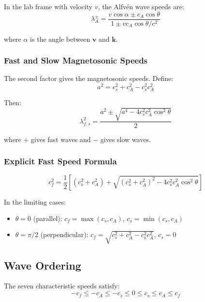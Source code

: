 \documentclass[12pt,a4paper]{article}
\begin{document}
In the lab frame with velocity $v$, the Alfv\'en wave speeds are:
\begin{equation}
\lambda_A^\pm = \frac{v \cos\alpha \pm c_A \cos\theta}{1 \pm v c_A \cos\theta/c^2}
\label{eq:alfven_lab_frame}
\end{equation}

where $\alpha$ is the angle between $\bm{v}$ and $\bm{k}$.

\subsubsection{Fast and Slow Magnetosonic Speeds}

The second factor gives the magnetosonic speeds. Define:
\begin{equation}
a^2 = c_s^2 + c_A^2 - c_s^2 c_A^2
\label{eq:a_squared}
\end{equation}

Then:
\begin{equation}
\lambda_{f,s}^2 = \frac{a^2 \pm \sqrt{a^4 - 4 c_s^2 c_A^2 \cos^2\theta}}{2}
\label{eq:fast_slow_speeds}
\end{equation}

where $+$ gives fast waves and $-$ gives slow waves.

\subsubsection{Explicit Fast Speed Formula}

\begin{equation}
\boxed{
c_f^2 = \frac{1}{2}\left[(c_s^2 + c_A^2) + \sqrt{(c_s^2 + c_A^2)^2 - 4c_s^2 c_A^2 \cos^2\theta}\right]
}
\label{eq:fast_speed_explicit}
\end{equation}

In the limiting cases:
\begin{itemize}
    \item $\theta = 0$ (parallel): $c_f = \max(c_s, c_A)$, $c_s = \min(c_s, c_A)$
    \item $\theta = \pi/2$ (perpendicular): $c_f = \sqrt{c_s^2 + c_A^2 - c_s^2 c_A^2}$, $c_s = 0$
\end{itemize}

\subsection{Wave Ordering}

The seven characteristic speeds satisfy:
\begin{equation}
-c_f \leq -c_A \leq -c_s \leq 0 \leq c_s \leq c_A \leq c_f
\label{eq:wave_ordering}
\end{equation}
\end{document}
